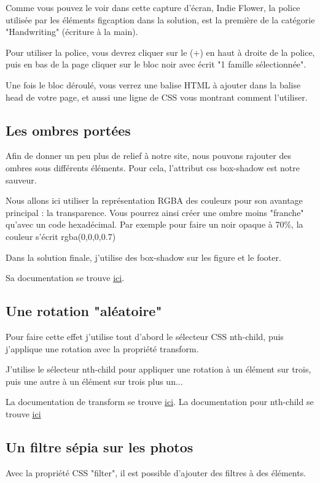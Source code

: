 Comme vous pouvez le voir dans cette capture d'écran, Indie Flower, la police
utilisée par les éléments figcaption dans la solution, est la première de la
catégorie "Handwriting" (écriture à la main).

Pour utiliser la police, vous devrez cliquer sur le (+) en haut à droite de la
police, puis en bas de la page cliquer sur le bloc noir avec écrit
"1 famille sélectionnée".

Une fois le bloc déroulé, vous verrez une balise HTML à ajouter dans la balise
head de votre page, et aussi une ligne de CSS vous montrant comment l'utiliser.

\subsection{Les ombres portées}
Afin de donner un peu plus de relief à notre site, nous pouvons rajouter des
ombres sous différents éléments. Pour cela, l'attribut css box-shadow est notre
sauveur.

Nous allons ici utiliser la représentation RGBA des couleurs pour son avantage
principal : la transparence. Vous pourrez ainsi créer une ombre moins "franche"
qu'avec un code hexadécimal. Par exemple pour faire un noir opaque à 70\%, la
couleur s'écrit rgba(0,0,0,0.7)


Dans la solution finale, j'utilise des box-shadow sur les figure et le footer.

Sa documentation se trouve \href{https://developer.mozilla.org/fr/docs/Web/CSS/box-shadow}{ici}.

\subsection{Une rotation "aléatoire"}
Pour faire cette effet j'utilise tout d'abord le sélecteur CSS nth-child, puis
j'applique une rotation avec la propriété transform.

J'utilise le sélecteur nth-child pour appliquer une rotation à un élément sur
trois, puis une autre à un élément sur trois plus un...

La documentation de transform se trouve \href{https://developer.mozilla.org/fr/docs/Web/CSS/transform}{ici}.
La documentation pour nth-child se trouve \href{https://developer.mozilla.org/fr/docs/Web/CSS/:nth-child}{ici}

\subsection{Un filtre sépia sur  les photos}
Avec la propriété CSS "filter", il est possible d'ajouter des filtres à des
éléments.

